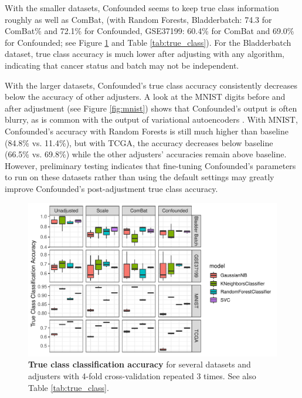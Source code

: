 \documentclass[notitlepage]{article}
\begin{document}
With the smaller datasets, Confounded seems to keep true class information roughly as well as ComBat, (with Random Forests, Bladderbatch: 74.3 for ComBat\% and 72.1\% for Confounded, GSE37199: 60.4\% for ComBat and 69.0\% for Confounded; see Figure \ref{fig:true_class} and Table \ref{tab:true_class}).
For the Bladderbatch dataset, true class accuracy is much lower after adjusting with any algorithm, indicating that cancer status and batch may not be independent.

With the larger datasets, Confounded's true class accuracy consistently decreases below the accuracy of other adjusters.
A look at the MNIST digits before and after adjustment (see Figure \ref{fig:mnist}) shows that Confounded's output is often blurry, as is common with the output of variational autoencoders \cite{hou_deep_2016}.
With MNIST, Confounded's accuracy with Random Forests is still much higher than baseline (84.8\% vs. 11.4\%), but with TCGA, the accuracy decreases below baseline (66.5\% vs. 69.8\%) while the other adjusters' accuracies remain above baseline.
However, preliminary testing indicates that fine-tuning Confounded's parameters to run on these datasets rather than using the default settings may greatly improve Confounded's post-adjustment true class accuracy.

\begin{figure}
	\centering
	\includegraphics[width=\columnwidth]{figures/final/true_class_accuracy}
	\caption{\textbf{True class classification accuracy} for several datasets and adjusters with 4-fold cross-validation repeated 3 times.
	See also Table \ref{tab:true_class}.}
	\label{fig:true_class}
\end{figure}
\begin{table}
	\centering
	
	\caption{\textbf{True class classification accuracy} for several datasets and adjusters.
	After adjustment by the ideal batch adjuster, all true class signal should be preserved, and all classifiers should therefore have the same accuracy in predicting true class before and after adjustment.
	See also Figure \ref{fig:true_class}.}
	\label{tab:true_class}
\end{table}
\end{document}
